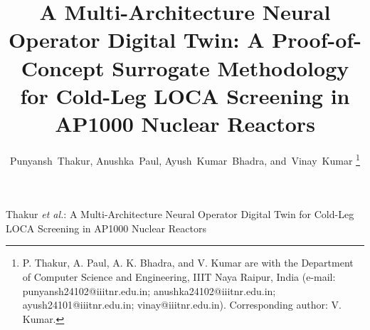 \documentclass[journal]{IEEEtran}
\begin{document}
\title{A Multi-Architecture Neural Operator Digital Twin: A Proof-of-Concept Surrogate Methodology for Cold-Leg LOCA Screening in AP1000 Nuclear Reactors}

\author{Punyansh~Thakur, Anushka~Paul, Ayush~Kumar~Bhadra, and~Vinay~Kumar
\thanks{P. Thakur, A. Paul, A. K. Bhadra, and V. Kumar are with the Department of Computer Science and Engineering, IIIT Naya Raipur, India (e-mail: punyansh24102@iiitnr.edu.in; anushka24102@iiitnr.edu.in; ayush24101@iiitnr.edu.in; vinay@iiitnr.edu.in). Corresponding author: V. Kumar.}}

%
{Thakur \MakeLowercase{\textit{et al.}}: A Multi-Architecture Neural Operator Digital Twin for Cold-Leg LOCA Screening in AP1000 Nuclear Reactors}

\maketitle
\end{document}
